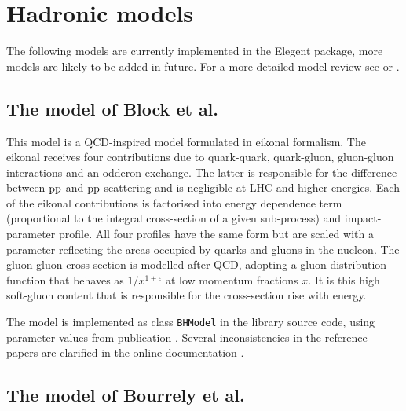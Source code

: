 \documentclass[preprint,12pt]{elsarticle}
\def\class#1{{\tt #1}}
\begin{document}

\section{Hadronic models}\label{s:had mod}

The following models are currently implemented in the Elegent package, more models are likely to be added in future. For a more detailed model review see \cite[section 1.1]{jan_thesis} or \cite[section 4]{dremin13}.

\subsection{The model of Block et al.}

This model \cite{bh99,block06} is a QCD-inspired model formulated in eikonal formalism. The eikonal receives four contributions due to quark-quark, quark-gluon, gluon-gluon interactions and an odderon exchange. The latter is responsible for the difference between $\rm pp$ and $\rm \bar p p$ scattering and is negligible at LHC and higher energies. Each of the eikonal contributions is factorised into energy dependence term (proportional to the integral cross-section of a given sub-process) and impact-parameter profile. All four profiles have the same form but are scaled with a parameter reflecting the areas occupied by quarks and gluons in the nucleon. The gluon-gluon cross-section is modelled after QCD, adopting a gluon distribution function that behaves as $1/x^{1+\epsilon}$ at low momentum fractions $x$. It is this high soft-gluon content that is responsible for the cross-section rise with energy.

The model is implemented as class \class{BHModel} in the library source code, using parameter values from publication \cite{block06}. Several inconsistencies in the reference papers \cite{bh99,block06} are clarified in the online documentation \cite[Wiki section, page HMBlock]{elegent}.

\subsection{The model of Bourrely et al.}
\end{document}
